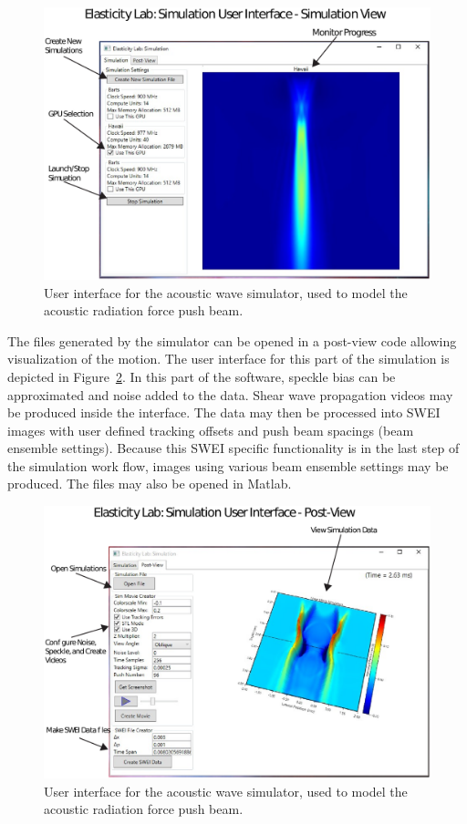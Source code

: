 \begin{figure}[htb!]
    \centering
    \includegraphics[width=0.75\linewidth]{steve/figs/image4.png}
    \caption{User interface for the acoustic wave simulator, used to model the
    acoustic radiation force push beam.} 
\label{fig:steve-UI}
\end{figure}

The files generated by the simulator can be opened in a post-view code allowing
visualization of the motion. The user interface for this part of the simulation
is depicted in Figure~\ref{fig:steve-post-UI}. In this part of the software, speckle
bias can be approximated and noise added to the data. Shear wave propagation
videos may be produced inside the interface. The data may then be processed
into SWEI images with user defined tracking offsets and push beam spacings
(beam ensemble settings). Because this SWEI specific functionality is in the
last step of the simulation work flow, images using various beam ensemble
settings may be produced. The files may also be opened in Matlab.

\begin{figure}[htb!]
    \centering
    \includegraphics[width=0.75\linewidth]{steve/figs/image5.png}
    \caption{User interface for the acoustic wave simulator, used to model the
    acoustic radiation force push beam.} 
\label{fig:steve-post-UI}
\end{figure}

